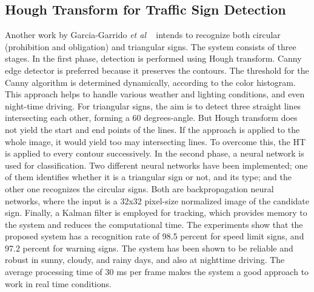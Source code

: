 \documentclass[review,number]{elsarticle}
\begin{document}
\subsection{Hough Transform for Traffic Sign Detection}
Another work by Garcia-Garrido \textit{et al} ~\cite{signbib18} intends to recognize both circular (prohibition and obligation) and triangular signs. The system consists of three stages. In the first phase, detection is performed using Hough transform. Canny edge detector is preferred because it preserves the contours. The threshold for the Canny algorithm is determined dynamically, according to the color histogram. This approach helps to handle various weather and lighting conditions, and even night-time driving. For triangular signs, the aim is to detect three straight lines intersecting each other, forming a 60 degrees-angle. But Hough transform does not yield the start and end points of the lines. If the approach is applied to the whole image, it would yield too may intersecting lines. To overcome this, the HT is applied to every contour successively. In the second phase, a neural network is used for classification. Two different neural networks have been implemented; one of them identifies whether it is a triangular sign or not, and its type; and the other one recognizes the circular signs. Both are backpropagation neural networks, where the input is a 32x32 pixel-size normalized image of the candidate sign. Finally, a Kalman filter is employed for tracking, which provides memory to the system and reduces the computational time. The experiments show that the proposed system has a recognition rate of 98.5 percent for speed limit signs, and 97.2 percent for warning signs. The system has been shown to be reliable and robust in sunny, cloudy, and rainy days, and also at nighttime driving. The average processing time of 30 ms per frame makes the system a good approach to work in real time conditions.
\end{document}
